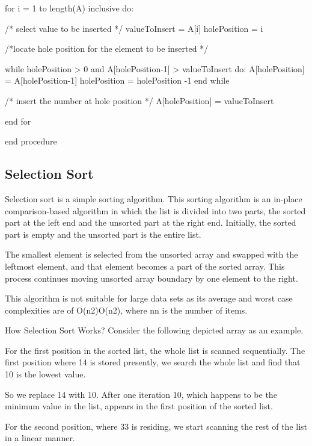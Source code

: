    for i = 1 to length(A) inclusive do:

      /* select value to be inserted */
      valueToInsert = A[i]
      holePosition = i

      /*locate hole position for the element to be inserted */

      while holePosition > 0 and A[holePosition-1] > valueToInsert do:
         A[holePosition] = A[holePosition-1]
         holePosition = holePosition -1
      end while

      /* insert the number at hole position */
      A[holePosition] = valueToInsert

   end for

end procedure

\subsection{Selection Sort}

Selection sort is a simple sorting algorithm. This sorting algorithm is an in-place comparison-based algorithm in which the list is divided into two parts, the sorted part at the left end and the unsorted part at the right end. Initially, the sorted part is empty and the unsorted part is the entire list.

The smallest element is selected from the unsorted array and swapped with the leftmost element, and that element becomes a part of the sorted array. This process continues moving unsorted array boundary by one element to the right.

This algorithm is not suitable for large data sets as its average and worst case complexities are of O(n2)Ο(n2), where nn is the number of items.

How Selection Sort Works?
Consider the following depicted array as an example.



For the first position in the sorted list, the whole list is scanned sequentially. The first position where 14 is stored presently, we search the whole list and find that 10 is the lowest value.



So we replace 14 with 10. After one iteration 10, which happens to be the minimum value in the list, appears in the first position of the sorted list.



For the second position, where 33 is residing, we start scanning the rest of the list in a linear manner.



